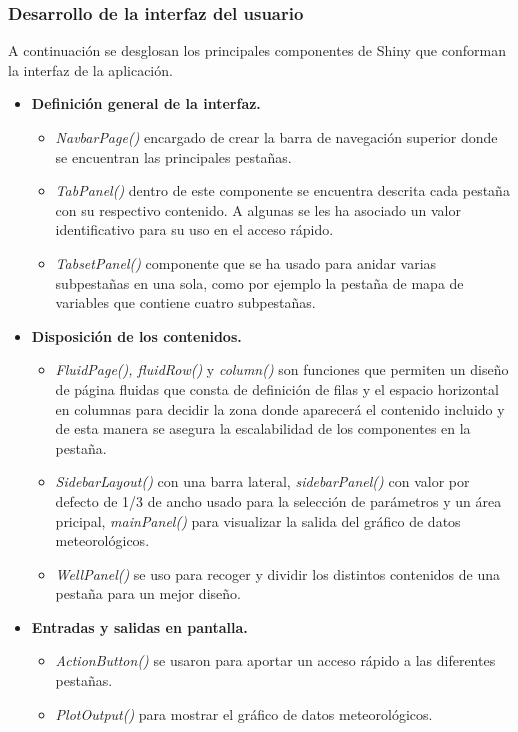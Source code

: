 \subsubsection{Desarrollo de la interfaz del usuario}
A continuación se desglosan los principales componentes de Shiny que conforman la interfaz de la aplicación.
\begin{itemize}
    \item \textbf{Definición general de la interfaz.}
    \begin{itemize}
        \item \textit{NavbarPage()} encargado de crear la barra de navegación superior donde se encuentran las principales pestañas. 
        \item \textit{TabPanel()} dentro de este componente se encuentra descrita cada pestaña con su respectivo contenido. A algunas se les ha asociado un valor identificativo para su uso en el acceso rápido.
        \item \textit{TabsetPanel()} componente que se ha usado para anidar varias subpestañas en una sola, como por ejemplo la pestaña de mapa de variables que contiene cuatro subpestañas.
    \end{itemize}
    \item \textbf{Disposición de los contenidos.}
    \begin{itemize}
        \item \textit{FluidPage(), fluidRow()} y \textit{column()} son funciones que permiten un diseño de página fluidas que consta de definición de filas y el espacio horizontal en columnas para decidir la zona donde aparecerá el contenido incluido y de esta manera se asegura la escalabilidad de los componentes en la pestaña.
        \item \textit{SidebarLayout()} con una barra lateral, \textit{sidebarPanel()} con valor por defecto de 1/3 de ancho usado para la selección de parámetros y un área pricipal, \textit{mainPanel()} para visualizar la salida del gráfico de datos meteorológicos.
        \item \textit{WellPanel()} se uso para recoger y dividir los distintos contenidos de una pestaña para un mejor diseño.
    \end{itemize}
    \item \textbf{Entradas y salidas en pantalla.}
    \begin{itemize}
        \item \textit{ActionButton()} se usaron para aportar un acceso rápido a las diferentes pestañas.
        \item \textit{PlotOutput()} para mostrar el gráfico de datos meteorológicos.

\end{itemize}
\end{itemize}
